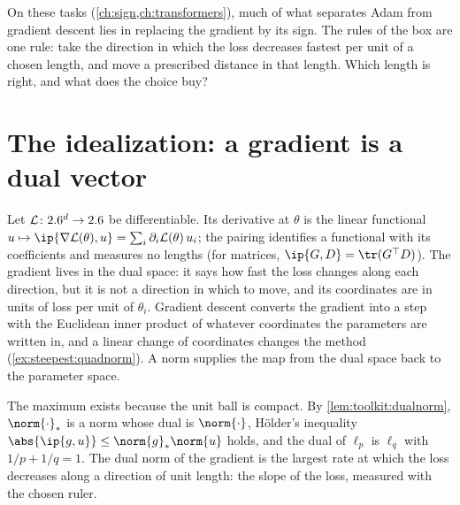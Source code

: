 \begin{refsection}
On these tasks (\cref{ch:sign,ch:transformers}), much of what separates Adam from gradient descent lies in replacing the gradient by its sign. The rules of the box are one rule: take the direction in which the loss decreases fastest per unit of a chosen length, and move a prescribed distance in that length. Which length is right, and what does the choice buy?

\section{The idealization: a gradient is a dual vector}\label{sec:steepest:idealization}

Let $\mathcal{L}\colon2.6^d\to2.6$ be differentiable. Its derivative at $\theta$ is the linear functional $u\mapsto\ip{\nabla\Loss(\theta),u}=\sum_i\partial_i\Loss(\theta)\,u_i$; the pairing identifies a functional with its coefficients and measures no lengths (for matrices, $\ip{G,D}=\tr(G^\top D)$). The gradient lives in the dual space: it says how fast the loss changes along each direction, but it is not a direction in which to move, and its coordinates are in units of loss per unit of $\theta_i$. Gradient descent converts the gradient into a step with the Euclidean inner product of whatever coordinates the parameters are written in, and a linear change of coordinates changes the method (\cref{ex:steepest:quadnorm}). A norm supplies the map from the dual space back to the parameter space.


The maximum exists because the unit ball is compact. By \cref{lem:toolkit:dualnorm}, $\norm{\cdot}_*$ is a norm whose dual is $\norm{\cdot}$, Hölder's inequality $\abs{\ip{g,u}}\le\norm{g}_*\norm{u}$ holds, and the dual of $\ell_p$ is $\ell_q$ with $1/p+1/q=1$. The dual norm of the gradient is the largest rate at which the loss decreases along a direction of unit length: the slope of the loss, measured with the chosen ruler.



\end{refsection}
